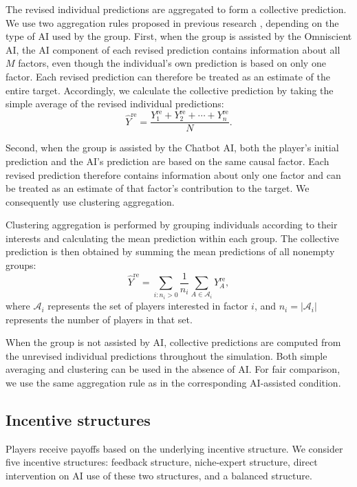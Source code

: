 \documentclass[12pt]{article}
\begin{document}
The revised individual predictions are aggregated to form a collective prediction. We use two aggregation rules proposed in previous research \citep{wang2025individual}, depending on the type of AI used by the group.
First, when the group is assisted by the Omniscient AI, the AI component of each revised prediction contains information about all $M$ factors, even though the individual's own prediction is based on only one factor. Each revised prediction can therefore be treated as an estimate of the entire target. Accordingly, we calculate the collective prediction by taking the simple average of the revised individual predictions:
\begin{equation}
\hat{Y}^{\mathrm{re}} = \frac{Y_1^{\mathrm{re}} + Y_2^{\mathrm{re}} + \cdots + Y_n^{\mathrm{re}}}{N}.
\end{equation}

Second, when the group is assisted by the Chatbot AI, both the player's initial prediction and the AI's prediction are based on the same causal factor. Each revised prediction therefore contains information about only one factor and can be treated as an estimate of that factor's contribution to the target. We consequently use clustering aggregation.

Clustering aggregation is performed by grouping individuals according to their interests and calculating the mean prediction within each group. The collective prediction is then obtained by summing the mean predictions of all nonempty groups:
\begin{equation}
\hat{Y}^{\mathrm{re}} = \sum_{i:n_i>0} \frac{1}{n_i} \sum_{A\in\mathcal{A}_i} Y_A^{\mathrm{re}},
\end{equation}
where $\mathcal{A}_i$ represents the set of players interested in factor $i$, and $n_i=|\mathcal{A}_i|$ represents the number of players in that set.

When the group is not assisted by AI, collective predictions are computed from the unrevised individual predictions throughout the simulation. Both simple averaging and clustering can be used in the absence of AI. For fair comparison, we use the same aggregation rule as in the corresponding AI-assisted condition.


\subsection*{Incentive structures}

Players receive payoffs based on the underlying incentive structure. 
We consider five incentive structures: feedback structure, niche-expert structure, direct intervention on AI use of these two structures, and a balanced structure.
\end{document}
